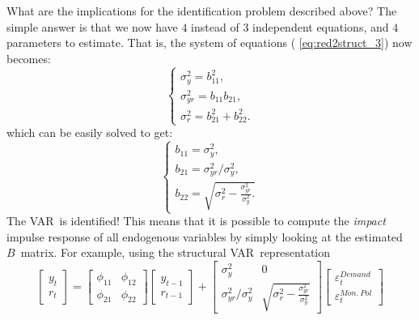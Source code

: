 \documentclass[10pt]{article}
\begin{document}
What are the implications for the identification problem described above?
The simple answer is that we now have $4$ instead of $3$ independent
equations, and $4$ parameters to estimate. That is, the system of equations (%
\ref{eq:red2struct_3}) now becomes:%
\begin{equation}
\left\{
\begin{array}{l}
\sigma _{y}^{2}=b_{11}^{2}, \\
\sigma _{yr}^{2}=b_{11}b_{21}, \\
\sigma _{r}^{2}=b_{21}^{2}+b_{22}^{2}.%
\end{array}%
\right.   \label{eq:red2struct_ch}
\end{equation}%
which can be easily solved to get:%
\begin{equation*}
\left\{
\begin{array}{l}
b_{11}=\sigma _{y}^{2}, \\
b_{21}=\sigma _{yr}^{2}/\sigma _{y}^{2}, \\
b_{22}=\sqrt{\sigma _{r}^{2}-\frac{\sigma _{yr}^{2}}{\sigma _{y}^{2}}.}%
\end{array}%
\right.
\end{equation*}%
The VAR\ is identified! This means that it is possible to compute the \emph{%
impact} impulse response of all endogenous variables by simply looking at
the estimated $B$\ matrix. For example, using the structural VAR\
representation
\begin{equation*}
\left[
\begin{array}{c}
y_{t} \\
r_{t}%
\end{array}%
\right] =%
\begin{bmatrix}
\phi _{11} & \phi _{12} \\
\phi _{21} & \phi _{22}%
\end{bmatrix}%
\left[
\begin{array}{c}
y_{t-1} \\
r_{t-1}%
\end{array}%
\right] +\left[
\begin{array}{cc}
\sigma _{y}^{2} & 0 \\
\sigma _{yr}^{2}/\sigma _{y}^{2} & \sqrt{\sigma _{r}^{2}-\frac{\sigma
_{yr}^{2}}{\sigma _{y}^{2}}}%
\end{array}%
\right]
\begin{bmatrix}
\varepsilon _{t}^{Demand} \\
\varepsilon _{t}^{Mon.\ Pol}%
\end{bmatrix}%
\end{equation*}%
\end{document}

